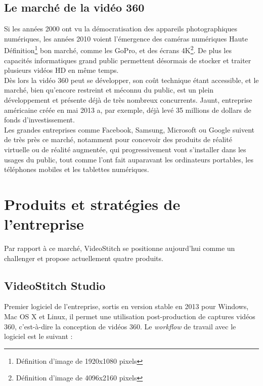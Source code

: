 \subsection{Le marché de la vidéo 360}
Si les années 2000 ont vu la démocratisation des appareils photographiques numériques,
les années 2010 voient l'émergence des caméras numériques Haute 
Définition\footnote{Définition d'image de 1920x1080 pixels} bon marché, comme les GoPro,
et des écrans 4K\footnote{Définition d'image de 4096x2160 pixels}. De plus les capacités
informatiques grand public permettent désormais de stocker et traiter plusieurs 
vidéos HD en même temps.\\
Dès lors la vidéo 360 peut se développer, son coût technique
étant accessible, et le marché, bien qu'encore restreint et méconnu du public,
est un plein développement et présente déjà de très nombreux concurrents. Jaunt,
entreprise américaine créée en mai 2013 a, par exemple, déjà levé 35 millions
de dollars de fonds d'investissement\cite{jaunt-fundings}.\\
Les grandes entreprises comme Facebook\cite{facebook-vr}, Samsung\cite{samsung-vr}, 
Microsoft\cite{microsoft-vr} ou Google\cite{google-vr} suivent de
très près ce marché, notamment pour concevoir des produits de réalité virtuelle 
ou de réalité augmentée, qui progressivement vont s'installer dans les usages
du public, tout comme l'ont fait auparavant les ordinateurs portables, les téléphones mobiles
et les tablettes numériques.\\

\section{Produits et stratégies de l'entreprise}
Par rapport à ce marché, VideoStitch se positionne aujourd'hui comme un challenger
et propose actuellement quatre produits\cite{videostitch-products}.
\subsection{VideoStitch Studio}
\label{videostitch-studio-section}
\label{videostitch-studio}
Premier logiciel de l'entreprise, sortis en version stable en 2013 pour Windows, Mac OS X et Linux,
il permet une utilisation post-production de captures vidéos 360, c'est-à-dire 
la conception de vidéos 360. Le \textit{workflow} de travail avec le logiciel est le suivant : 
